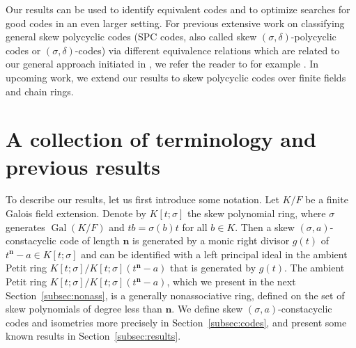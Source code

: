 \documentclass[11pt]{amsart}
\theoremstyle{plain}
\theoremstyle{definition}
\numberwithin{equation}{section}
\numberwithin{figure}{section}
\newcommand{\de}{{\mathbf{n}}}  %
\DeclareMathOperator{\Gal}{Gal}
\begin{document}
 Our results can be used to identify equivalent codes
  and to optimize searches for good codes in an even larger setting. For previous extensive work on classifying  general
skew polycyclic codes (SPC codes, also called skew $(\sigma,\delta)$-polycyclic codes or $(\sigma,\delta)$-codes) via different equivalence relations which are  related to our general approach initiated in \cite{Pumpluen2025}, we refer the reader to for example
\cite{BoulanouarBatoulBoucher2021}. %
In upcoming work, we extend our results to skew polycyclic codes over finite fields and chain rings.





\section{A collection of terminology and previous results}\label{sec:notation}


To describe our results, let us first introduce some notation. Let $K/F$ be a finite Galois field extension. %
Denote by $K[t;\sigma]$  the skew polynomial ring, where $\sigma$ generates $\Gal(K/F)$ and $tb=\sigma(b)t$ for all $b\in K$.
Then a skew $(\sigma,a)$-constacyclic code of length $\de$ is generated by a monic right divisor $g(t)$ of $t^\de-a\in K[t;\sigma]$ and can be identified with a left principal ideal in the  ambient Petit ring $K[t;\sigma]/K[t;\sigma](t^\de-a)$ that is generated by $g(t)$. The  ambient Petit ring $K[t;\sigma]/K[t;\sigma](t^\de-a)$,  which we present in the next  Section~\ref{subsec:nonass}, is a generally nonassociative ring, defined on the set of skew polynomials of degree less than $\de$.  We define skew $(\sigma,a)$-constacyclic  codes and isometries more precisely in Section~\ref{subsec:codes}, and present some known results in Section~\ref{subsec:results}.

\end{document}
